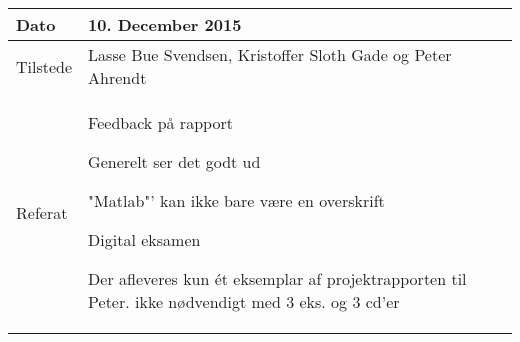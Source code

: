 \begin{center}
	\begin{tabular}{| l | p{10cm} |}
		\hline
		Dato		& 10. December 2015\\ \hline
		Tilstede 	& Lasse Bue Svendsen, Kristoffer Sloth Gade og Peter Ahrendt\\ \hline
		Referat		& \vspace{-5mm}\begin{myEnumerate}
			\item Feedback på rapport
			\begin{myItemize}
				\item Generelt ser det godt ud
				\item "Matlab"' kan ikke bare være en overskrift
			\end{myItemize}
			\item Digital eksamen
			\begin{myItemize}
				\item Der afleveres kun ét eksemplar af projektrapporten til Peter. ikke nødvendigt med 3 eks. og 3 cd'er
			\end{myItemize}
		\end{myEnumerate}\\ 	
		\hline
	\end{tabular}
\end{center}